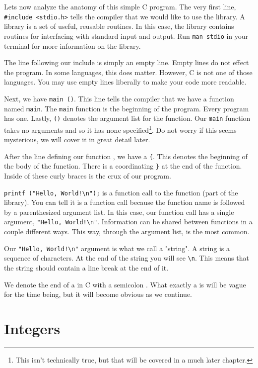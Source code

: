 Lets now analyze the anatomy of this simple C program. The very first line,
\verb|#include <stdio.h>| tells the compiler that we would like to use the
 library. A library is a set of useful, reusable routines. In this
case, the  library contains routines for interfacing with standard
input and output. Run \verb|man stdio| in your terminal for more information on
the  library.

The line following our include is simply an empty line. Empty lines do not
effect the program. In some languages, this does matter. However, C is not one
of those languages. You may use empty lines liberally to make your code more
readable.

Next, we have \verb|main ()|. This line tells the compiler that we have a
function named \verb|main|. The \verb|main| function is the beginning of the
program. Every program has one. Lastly, \verb|()| denotes the argument list for
the function. Our \verb|main| function takes no arguments and so it has none
specified\footnote[1]{This isn't technically true, but that will be covered in
a much later chapter.}. Do not worry if this seems mysterious, we will cover it
in great detail later.

After the line defining our function , we have a \verb|{|. This
denotes the beginning of the body of the function. There is a coordinating
\verb|}| at the end of the function. Inside of these curly braces is the crux
of our program.

\verb|printf ("Hello, World!\n");| is a function call to the 
function (part of the  library). You can tell it is a function
call because the function name is followed by a parenthesized argument list.
In this case, our function call has a single argument,
\verb|"Hello, World!\n"|. Information can be shared between functions in
a couple different ways. This way, through the argument list, is the most
common.

Our \verb|"Hello, World!\n"| argument is what we call a "string". A string
is a sequence of characters. At the end of the string you will see \verb|\n|.
This means that the string should contain a line break at the end of it.

We denote the end of a  in C with a semicolon \ident{;}.
What exactly a  is will be vague for the time being, but it
will become obvious as we continue.

\section{Integers}

